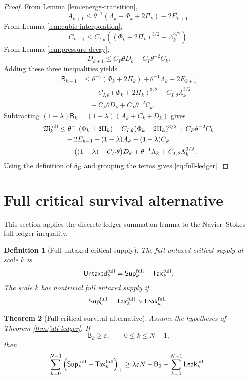\documentclass[11pt]{article}
\numberwithin{equation}{section}
\newtheorem{theorem}{Theorem}[section]
\newtheorem{definition}[theorem]{Definition}
\newcommand{\eps}{\varepsilon}
\newcommand{\Supp}{\mathsf{Sup}}
\newcommand{\Tax}{\mathsf{Tax}}
\newcommand{\Leak}{\mathsf{Leak}}
\newcommand{\Mres}{\mathfrak M}
\newcommand{\Bbad}{\mathsf B}
\newcommand{\pos}[1]{\left(#1\right)_+}
\begin{document}
\begin{proof}
From Lemma \ref{lem:energy-transition},
\[
A_{k+1}\leq \theta^{-1}(\Lambda_k+\Phi_k+2\Pi_k)-2E_{k+1}.
\]
From Lemma \ref{lem:cubic-interpolation},
\[
C_{k+1}\leq C_{I,\theta}\left((\Phi_k+2\Pi_k)^{3/2}+\Lambda_k^{3/2}\right).
\]
From Lemma \ref{lem:pressure-decay},
\[
D_{k+1}\leq C_P\theta D_k+C_P\theta^{-2}C_k.
\]
Adding these three inequalities yields
\begin{align*}
\Bbad_{k+1}
&\leq
\theta^{-1}(\Phi_k+2\Pi_k)+\theta^{-1}\Lambda_k-2E_{k+1}\\
&\quad +C_{I,\theta}(\Phi_k+2\Pi_k)^{3/2}
+C_{I,\theta}\Lambda_k^{3/2}\\
&\quad +C_P\theta D_k+C_P\theta^{-2}C_k.
\end{align*}
Subtracting $(1-\lambda)\Bbad_k=(1-\lambda)(A_k+C_k+D_k)$ gives
\begin{align*}
\Mres_k^{\rm full}
&\leq
\theta^{-1}(\Phi_k+2\Pi_k)
+C_{I,\theta}(\Phi_k+2\Pi_k)^{3/2}
+C_P\theta^{-2}C_k\\
&\quad -2E_{k+1}-(1-\lambda)A_k-(1-\lambda)C_k\\
&\quad -\big((1-\lambda)-C_P\theta\big)D_k
+\theta^{-1}\Lambda_k+C_{I,\theta}\Lambda_k^{3/2}.
\end{align*}
Using the definition of $\delta_D$ and grouping the terms gives \eqref{eq:full-ledger}.
\end{proof}

\section{Full critical survival alternative}\label{sec:full-survival}
\noindent This section applies the discrete ledger summation lemma to the Navier--Stokes full ledger inequality.

\begin{definition}[Full untaxed critical supply]\label{def:full-untaxed}
The full untaxed critical supply at scale $k$ is
\[
\mathsf{Untaxed}_k^{\rm full}
=\Supp_k^{\rm full}-\Tax_k^{\rm full}.
\]
The scale $k$ has nontrivial full untaxed supply if
\[
\Supp_k^{\rm full}-\Tax_k^{\rm full}>\Leak_k^{\rm full}.
\]
\end{definition}

\begin{theorem}[Full critical survival alternative]\label{thm:full-survival}
Assume the hypotheses of Theorem \ref{thm:full-ledger}.  If
\[
\Bbad_k\geq\eps,
\qquad 0\leq k\leq N-1,
\]
then
\begin{equation}\label{eq:full-survival}
\sum_{k=0}^{N-1}\pos{\Supp_k^{\rm full}-\Tax_k^{\rm full}}
\geq
\lambda\eps N-
\Bbad_0-
\sum_{k=0}^{N-1}\Leak_k^{\rm full}.
\end{equation}
\end{theorem}
\end{document}
